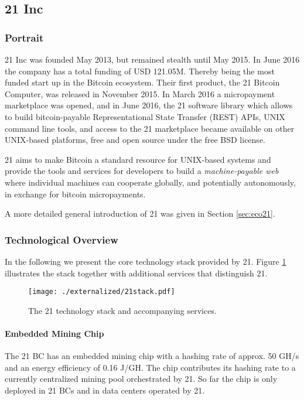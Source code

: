 \subsection{21 Inc}

\subsubsection{Portrait}
21 Inc was founded May 2013, but remained stealth until May 2015. In June 2016 the company has a total funding of USD 121.05M. Thereby being the most funded start up in the Bitcoin ecosystem. Their first product, the 21 Bitcoin Computer, was released in November 2015. In March 2016 a micropayment marketplace was opened, and in June 2016, the 21 software library which allows to build bitcoin-payable Representational State Transfer (REST) APIs, UNIX command line tools, and access to the 21 marketplace became available on other UNIX-based platforms, free and open source under the free BSD license.

21 aims to make Bitcoin a standard resource for UNIX-based systems and provide the tools and services for developers to build a \emph{machine-payable web} where individual machines can cooperate globally, and potentially autonomously, in exchange for bitcoin micropayments.

A more detailed general introduction of 21 was given in Section \ref{sec:eco21}.

\subsubsection{Technological Overview}

In the following we present the core technology stack provided by 21. Figure \ref{fig:21stack} illustrates the stack together with additional services that distinguish 21.

\begin{figure}
\centering
\texttt{[image: ./externalized/21stack.pdf]}
\caption{The 21 technology stack and accompanying services.}
\label{fig:21stack}
\end{figure}

\paragraph{Embedded Mining Chip}

The 21 BC has an embedded mining chip with a hashing rate of approx. 50 GH/s and an energy efficiency of 0.16 J/GH. The chip contributes its hashing rate to a currently centralized mining pool orchestrated by 21. So far the chip is only deployed in 21 BCs and in data centers operated by 21. 	

